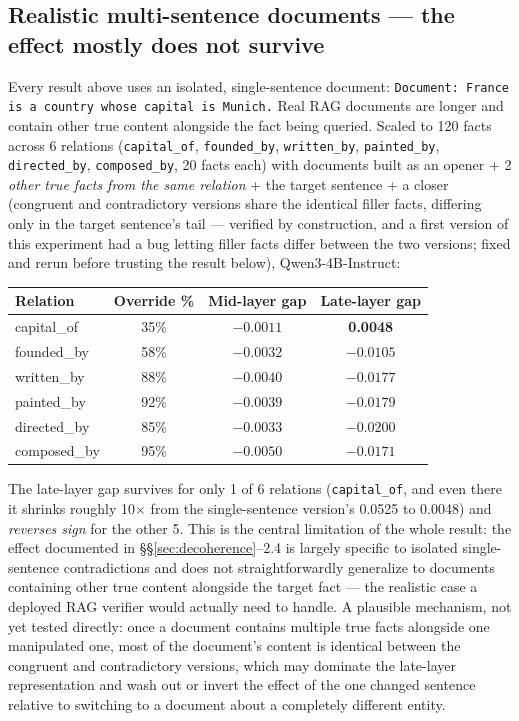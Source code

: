 \documentclass[11pt]{article}
\begin{document}
\subsection{Realistic multi-sentence documents --- the effect mostly does not survive}
\label{sec:realistic}

Every result above uses an isolated, single-sentence document:
\texttt{Document: France is a country whose capital is Munich.} Real RAG
documents are longer and contain other true content alongside the fact being
queried. Scaled to 120 facts across 6 relations (\texttt{capital\_of},
\texttt{founded\_by}, \texttt{written\_by}, \texttt{painted\_by},
\texttt{directed\_by}, \texttt{composed\_by}, 20 facts each) with documents
built as an opener + 2 \emph{other true facts from the same relation} + the
target sentence + a closer (congruent and contradictory versions share the
identical filler facts, differing only in the target sentence's tail ---
verified by construction, and a first version of this experiment had a bug
letting filler facts differ between the two versions; fixed and rerun before
trusting the result below), Qwen3-4B-Instruct:

\begin{table}[h]
\centering
\begin{tabular}{@{}lccc@{}}
\toprule
Relation & Override \% & Mid-layer gap & Late-layer gap \\
\midrule
capital\_of & 35\% & $-0.0011$ & \textbf{0.0048} \\
founded\_by & 58\% & $-0.0032$ & \textbf{$-0.0105$} \\
written\_by & 88\% & $-0.0040$ & \textbf{$-0.0177$} \\
painted\_by & 92\% & $-0.0039$ & \textbf{$-0.0179$} \\
directed\_by & 85\% & $-0.0033$ & \textbf{$-0.0200$} \\
composed\_by & 95\% & $-0.0050$ & \textbf{$-0.0171$} \\
\bottomrule
\end{tabular}
\end{table}

The late-layer gap survives for only 1 of 6 relations (\texttt{capital\_of},
and even there it shrinks roughly 10$\times$ from the single-sentence
version's 0.0525 to 0.0048) and \emph{reverses sign} for the other 5. This is
the central limitation of the whole result: the effect documented in
\S\S\ref{sec:decoherence}--2.4 is largely specific to isolated single-sentence
contradictions and does not straightforwardly generalize to documents
containing other true content alongside the target fact --- the realistic
case a deployed RAG verifier would actually need to handle. A plausible
mechanism, not yet tested directly: once a document contains multiple true
facts alongside one manipulated one, most of the document's content is
identical between the congruent and contradictory versions, which may
dominate the late-layer representation and wash out or invert the effect of
the one changed sentence relative to switching to a document about a
completely different entity.
\end{document}
